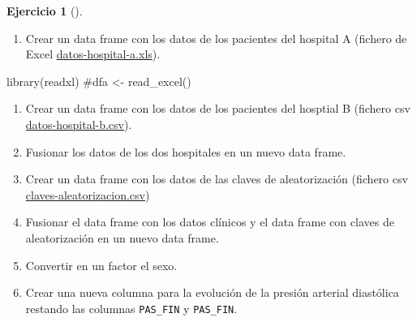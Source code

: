 \documentclass[
  a4paper,
]{scrreport}
\newenvironment{Shaded}{\begin{snugshade}}{\end{snugshade}}
\newcommand{\CommentTok}[1]{\textcolor[rgb]{0.37,0.37,0.37}{#1}}
\newcommand{\FunctionTok}[1]{\textcolor[rgb]{0.28,0.35,0.67}{#1}}
\newcommand{\NormalTok}[1]{\textcolor[rgb]{0.00,0.23,0.31}{#1}}
\providecommand{\tightlist}{%
  \setlength{\itemsep}{0pt}\setlength{\parskip}{0pt}}\usepackage{longtable,booktabs,array}
\theoremstyle{definition}
\newtheorem{exercise}{Ejercicio}[chapter]
\theoremstyle{remark}
\begin{document}
\begin{exercise}[]
\begin{enumerate}
\def\labelenumi{\alph{enumi}.}
\tightlist
\item
  Crear un data frame con los datos de los pacientes del hospital A
  (fichero de Excel
  \href{datos/hipertension/datos-hospital-a.xls}{datos-hospital-a.xls}).
\end{enumerate}

\begin{tcolorbox}[enhanced jigsaw, breakable, arc=.35mm, leftrule=.75mm, toptitle=1mm, opacitybacktitle=0.6, opacityback=0, title=\textcolor{quarto-callout-tip-color}{\faLightbulb}\hspace{0.5em}{Solución}, colframe=quarto-callout-tip-color-frame, titlerule=0mm, bottomtitle=1mm, colback=white, bottomrule=.15mm, colbacktitle=quarto-callout-tip-color!10!white, toprule=.15mm, rightrule=.15mm, left=2mm, coltitle=black]

\begin{Shaded}
\begin{Highlighting}[]
\FunctionTok{library}\NormalTok{(readxl)}
\CommentTok{\#dfa \textless{}{-} read\_excel()}
\end{Highlighting}
\end{Shaded}

\end{tcolorbox}

\begin{enumerate}
\def\labelenumi{\alph{enumi}.}
\setcounter{enumi}{1}
\item
  Crear un data frame con los datos de los pacientes del hosptial B
  (fichero csv
  \href{datos/hipertension/datos-hospital-b.csv}{datos-hospital-b.csv}).
\item
  Fusionar los datos de los dos hospitales en un nuevo data frame.
\item
  Crear un data frame con los datos de las claves de aleatorización
  (fichero csv
  \href{datos/hipertension/claves-aleatorizacion.csv}{claves-aleatorizacion.csv})
\item
  Fusionar el data frame con los datos clínicos y el data frame con
  claves de aleatorización en un nuevo data frame.
\item
  Convertir en un factor el sexo.
\item
  Crear una nueva columna para la evolución de la presión arterial
  diastólica restando las columnas \texttt{PAS\_FIN} y
  \texttt{PAS\_FIN}.
\end{enumerate}

\end{exercise}
\end{document}
